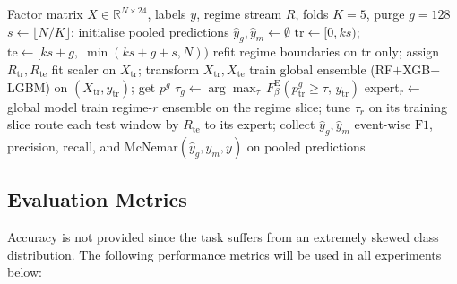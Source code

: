 \documentclass[]{interact}
\begin{document}
\begin{algorithm}[!t]
\caption{Leakage-Free Walk-Forward Training and Evaluation}
\label{alg:walk_forward}
\begin{algorithmic}[1]
\REQUIRE Factor matrix $X\in\mathbb{R}^{N\times 24}$, labels $y$, regime stream $R$, folds $K{=}5$, purge $g{=}128$
\STATE $s \leftarrow \lfloor N/K \rfloor$; \quad initialise pooled predictions $\hat{y}_g, \hat{y}_m \leftarrow \emptyset$
  \STATE $\text{tr} \leftarrow [0, ks)$; \quad $\text{te} \leftarrow [ks{+}g,\; \min(ks{+}g{+}s, N))$ 
  \STATE refit regime boundaries on $\text{tr}$ only; assign $R_{\text{tr}}, R_{\text{te}}$
  \STATE fit scaler on $X_{\text{tr}}$; transform $X_{\text{tr}}, X_{\text{te}}$
  \STATE train global ensemble (RF$+$XGB$+$LGBM) on $(X_{\text{tr}}, y_{\text{tr}})$; get $p^{g}$
  \STATE $\tau_g \leftarrow \arg\max_{\tau}\, F_\beta^{\mathrm{E}}(p^{g}_{\text{tr}} \!\ge\! \tau,\, y_{\text{tr}})$ 
      \STATE expert$_r \leftarrow$ global model 
    \ELSE
      \STATE train regime-$r$ ensemble on the regime slice; tune $\tau_r$ on its training slice
    \ENDIF
  \ENDFOR
  \STATE route each test window by $R_{\text{te}}$ to its expert; collect $\hat{y}_g, \hat{y}_m$
\ENDFOR
\RETURN event-wise $\mathrm{F1}$, precision, recall, and McNemar$(\hat{y}_g,\hat{y}_m,y)$ on pooled predictions
\end{algorithmic}
\end{algorithm}

\subsection{Evaluation Metrics}
\label{subsec:metrics}

Accuracy is not provided since the task suffers from an extremely skewed class distribution. The following performance metrics will be used in all experiments below:
\end{document}

